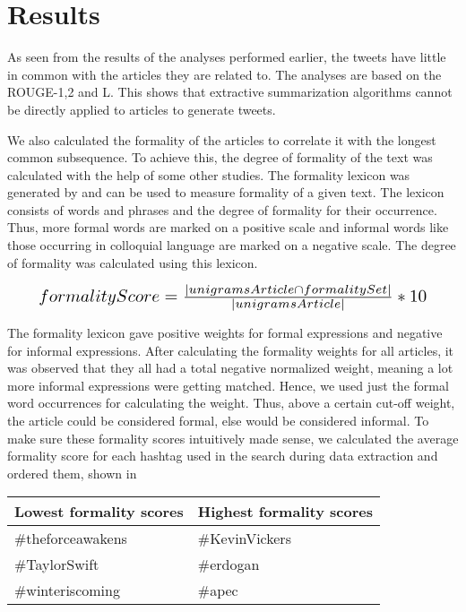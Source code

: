 \section{Results}

As seen from the results of the analyses performed earlier, the tweets have little in common with the articles they are related to. The analyses are based on the ROUGE-1,2 and L. This shows that extractive summarization algorithms cannot be directly applied to articles to generate tweets. 

We also calculated the formality of the articles to correlate it with the longest common subsequence. To achieve this, the degree of formality of the text was calculated with the help of some other studies. The formality lexicon was generated by  and can be used to measure formality of a given text. The lexicon consists of words and phrases and the degree of formality for their occurrence. Thus, more formal words are marked on a positive scale and informal words like those occurring in colloquial language are marked on a negative scale. The degree of formality was calculated using this lexicon.

\begin{equation}
\resizebox{.9\hsize}{!}{$formalityScore = \frac{| unigramsArticle \cap formalitySet |}{| unigramsArticle |} * 10$}
\end{equation}

The formality lexicon gave positive weights for formal expressions and negative for informal expressions. After calculating the formality weights for all articles, it was observed that they all had a total negative normalized weight, meaning a lot more informal expressions were getting matched. Hence, we used just the formal word occurrences for calculating the weight. Thus, above a certain cut-off weight, the article could be considered formal, else would be considered informal. To make sure these formality scores intuitively made sense, we calculated the average formality score for each hashtag used in the search during data extraction and ordered them, shown in 


\begin{table}[h]
\begin{tabular}{l|l}
\hline
Lowest formality scores & Highest formality scores \\ \hline
\#theforceawakens       & \#KevinVickers           \\
\#TaylorSwift           & \#erdogan                \\
\#winteriscoming        & \#apec                  \\ \hline
\end{tabular}
\label{tab:formal}
\end{table}

